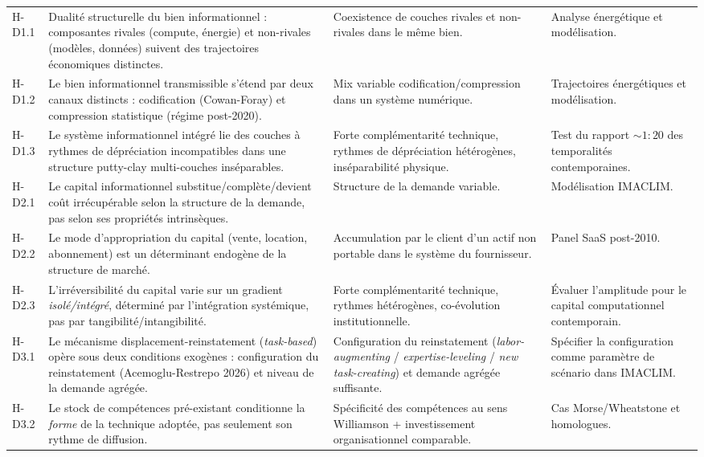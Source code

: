 \begin{landscape}
\begin{longtable}{p{1.6cm}p{6.5cm}p{6cm}p{4cm}}
H-D1.1 & Dualité structurelle du bien informationnel : composantes rivales (compute, énergie) et non-rivales (modèles, données) suivent des trajectoires économiques distinctes. & Coexistence de couches rivales et non-rivales dans le même bien. & Analyse énergétique et modélisation. \\
\addlinespace
H-D1.2 & Le bien informationnel transmissible s'étend par deux canaux distincts : codification (Cowan-Foray) et compression statistique (régime post-2020). & Mix variable codification/compression dans un système numérique. & Trajectoires énergétiques et modélisation. \\
\addlinespace
H-D1.3 & Le système informationnel intégré lie des couches à rythmes de dépréciation incompatibles dans une structure putty-clay multi-couches inséparables. & Forte complémentarité technique, rythmes de dépréciation hétérogènes, inséparabilité physique. & Test du rapport ${\sim}1:20$ des temporalités contemporaines. \\
\addlinespace
H-D2.1 & Le capital informationnel substitue/complète/devient coût irrécupérable selon la structure de la demande, pas selon ses propriétés intrinsèques. & Structure de la demande variable. & Modélisation IMACLIM. \\
\addlinespace
H-D2.2 & Le mode d'appropriation du capital (vente, location, abonnement) est un déterminant endogène de la structure de marché. & Accumulation par le client d'un actif non portable dans le système du fournisseur. & Panel SaaS post-2010. \\
\addlinespace
H-D2.3 & L'irréversibilité du capital varie sur un gradient \emph{isolé/intégré}, déterminé par l'intégration systémique, pas par tangibilité/intangibilité. & Forte complémentarité technique, rythmes hétérogènes, co-évolution institutionnelle. & Évaluer l'amplitude pour le capital computationnel contemporain. \\
\addlinespace
H-D3.1 & Le mécanisme displacement-reinstatement (\emph{task-based}) opère sous deux conditions exogènes : configuration du reinstatement (Acemoglu-Restrepo 2026) et niveau de la demande agrégée. & Configuration du reinstatement (\emph{labor-augmenting} / \emph{expertise-leveling} / \emph{new task-creating}) et demande agrégée suffisante. & Spécifier la configuration comme paramètre de scénario dans IMACLIM. \\
\addlinespace
H-D3.2 & Le stock de compétences pré-existant conditionne la \emph{forme} de la technique adoptée, pas seulement son rythme de diffusion. & Spécificité des compétences au sens Williamson + investissement organisationnel comparable. & Cas Morse/Wheatstone et homologues. \\

\end{longtable}
\end{landscape}
